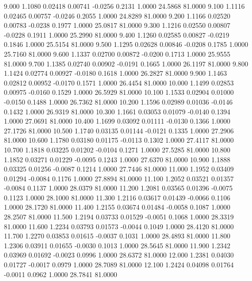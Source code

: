    9.000   1.1080   0.02418   0.00741  -0.0256   0.2131   1.0000  24.5868  81.0000
   9.100   1.1116   0.02465   0.00757  -0.0246   0.2055   1.0000  24.8289  81.0000
   9.200   1.1166   0.02520   0.00783  -0.0238   0.1977   1.0000  25.0817  81.0000
   9.300   1.1216   0.02550   0.00807  -0.0228   0.1911   1.0000  25.2990  81.0000
   9.400   1.1260   0.02585   0.00827  -0.0219   0.1846   1.0000  25.5154  81.0000
   9.500   1.1295   0.02628   0.00846  -0.0208   0.1785   1.0000  25.7160  81.0000
   9.600   1.1337   0.02700   0.00872  -0.0200   0.1713   1.0000  25.9555  81.0000
   9.700   1.1385   0.02740   0.00902  -0.0191   0.1665   1.0000  26.1197  81.0000
   9.800   1.1424   0.02774   0.00927  -0.0180   0.1618   1.0000  26.2827  81.0000
   9.900   1.1463   0.02812   0.00952  -0.0170   0.1571   1.0000  26.4454  81.0000
  10.000   1.1499   0.02853   0.00975  -0.0160   0.1529   1.0000  26.5929  81.0000
  10.100   1.1533   0.02904   0.01000  -0.0150   0.1488   1.0000  26.7362  81.0000
  10.200   1.1596   0.02989   0.01036  -0.0146   0.1432   1.0000  26.9319  81.0000
  10.300   1.1661   0.03053   0.01079  -0.0140   0.1394   1.0000  27.0691  81.0000
  10.400   1.1699   0.03092   0.01111  -0.0130   0.1366   1.0000  27.1726  81.0000
  10.500   1.1740   0.03135   0.01144  -0.0121   0.1335   1.0000  27.2906  81.0000
  10.600   1.1780   0.03180   0.01175  -0.0113   0.1302   1.0000  27.4117  81.0000
  10.700   1.1818   0.03225   0.01202  -0.0104   0.1271   1.0000  27.5285  81.0000
  10.800   1.1852   0.03271   0.01229  -0.0095   0.1243   1.0000  27.6370  81.0000
  10.900   1.1888   0.03325   0.01256  -0.0087   0.1214   1.0000  27.7446  81.0000
  11.000   1.1952   0.03409   0.01294  -0.0084   0.1176   1.0000  27.8894  81.0000
  11.100   1.2052   0.03521   0.01357  -0.0084   0.1137   1.0000  28.0379  81.0000
  11.200   1.2081   0.03565   0.01396  -0.0075   0.1123   1.0000  28.1000  81.0000
  11.300   1.2116   0.03617   0.01439  -0.0066   0.1106   1.0000  28.1720  81.0000
  11.400   1.2155   0.03674   0.01484  -0.0058   0.1087   1.0000  28.2507  81.0000
  11.500   1.2194   0.03733   0.01529  -0.0051   0.1068   1.0000  28.3319  81.0000
  11.600   1.2234   0.03793   0.01573  -0.0044   0.1049   1.0000  28.4120  81.0000
  11.700   1.2270   0.03853   0.01615  -0.0037   0.1031   1.0000  28.4893  81.0000
  11.800   1.2306   0.03911   0.01655  -0.0030   0.1013   1.0000  28.5645  81.0000
  11.900   1.2342   0.03969   0.01692  -0.0023   0.0996   1.0000  28.6372  81.0000
  12.000   1.2381   0.04030   0.01727  -0.0017   0.0979   1.0000  28.7089  81.0000
  12.100   1.2424   0.04098   0.01764  -0.0011   0.0962   1.0000  28.7841  81.0000
